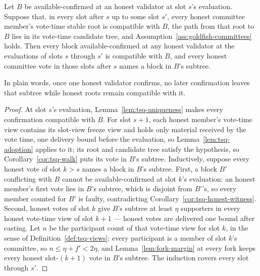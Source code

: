 \begin{lemma}
\label{lem:tsq-monotonicity}
Let \(B\) be available-confirmed at an honest validator at slot \(s\)'s
evaluation.  Suppose that, in every slot after \(s\) up to some slot
\(s'\), every honest committee member's vote-time stable root is compatible with
\(B\), the path from that root to \(B\) lies in its vote-time candidate
tree, and Assumption~\ref{ass:goldfish-committees} holds.  Then every
block available-confirmed at any honest validator at the evaluations of
slots \(s\) through \(s'\) is compatible with \(B\), and every honest
committee vote in those slots after \(s\) names a block in \(B\)'s
subtree.

In plain words, once one honest validator confirms, no later confirmation
leaves that subtree while honest roots remain compatible with it.
\end{lemma}

\begin{proof}
At slot \(s\)'s evaluation, Lemma~\ref{lem:tsq-uniqueness} makes every
confirmation compatible with \(B\).  For slot \(s+1\), each honest
member's vote-time view contains its slot-view freeze view and holds only
material received by the vote time, one delivery bound before the
evaluation, so Lemma~\ref{lem:tsq-adoption} applies to it; its root and
candidate tree satisfy the hypothesis, so Corollary~\ref{cor:tsq-walk}
puts its vote in \(B\)'s subtree.  Inductively, suppose every honest vote
of slot \(k>s\) names a block in \(B\)'s subtree.  First, a block \(B'\)
conflicting with \(B\) cannot be available-confirmed at slot \(k\)'s
evaluation: an honest member's first vote lies in \(B\)'s subtree, which
is disjoint from \(B'\)'s, so every member counted for \(B'\) is faulty,
contradicting Corollary~\ref{cor:tsq-honest-witness}.  Second, honest
votes of slot \(k\) give \(B\)'s subtree at least \(\eta\) supporters in
every honest vote-time view of slot \(k+1\) --- honest votes are delivered
one bound after casting.  Let \(n\) be the participant count of that
vote-time view for slot \(k\), in the sense of
Definition~\ref{def:tsq-views}: every participant is a member of slot
\(k\)'s committee, so
\(n\leq\eta+f'<2\eta\), and Lemma~\ref{lem:fork-margin} at every fork keeps
every honest slot-\((k+1)\) vote in \(B\)'s subtree.  The induction covers
every slot through \(s'\).
\end{proof}

